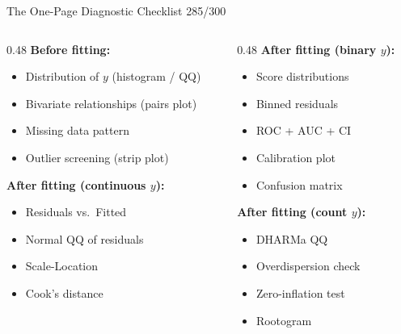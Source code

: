 \documentclass[10pt]{beamer}
\newcommand{\smark}[1]{\hfill{\scriptsize\color{codegray}#1}}
\begin{document}
\begin{frame}{The One-Page Diagnostic Checklist}
\smark{285/300}
\begin{columns}[T]
\begin{column}{0.48\textwidth}
    \textbf{Before fitting:}
    \begin{itemize}
        \item Distribution of $y$ (histogram / QQ)
        \item Bivariate relationships (pairs plot)
        \item Missing data pattern
        \item Outlier screening (strip plot)
    \end{itemize}
    \vspace{0.2cm}
    \textbf{After fitting (continuous $y$):}
    \begin{itemize}
        \item Residuals vs.\ Fitted
        \item Normal QQ of residuals
        \item Scale-Location
        \item Cook's distance
    \end{itemize}
\end{column}
\begin{column}{0.48\textwidth}
    \textbf{After fitting (binary $y$):}
    \begin{itemize}
        \item Score distributions
        \item Binned residuals
        \item ROC + AUC + CI
        \item Calibration plot
        \item Confusion matrix
    \end{itemize}
    \vspace{0.2cm}
    \textbf{After fitting (count $y$):}
    \begin{itemize}
        \item DHARMa QQ
        \item Overdispersion check
        \item Zero-inflation test
        \item Rootogram
    \end{itemize}
\end{column}
\end{columns}
\end{frame}
\end{document}
